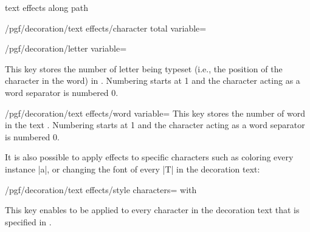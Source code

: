 \begin{decoration}{text effects along path}
\begin{key}{/pgf/decoration/text effects/character total variable=}
\end{key}

\begin{key}{/pgf/decoration/letter variable=}

  This key stores the number of letter being typeset (i.e., the position of the character
  in the word) in . Numbering starts at 1 and
  the character acting as a word separator is numbered 0.
  
\begin{codeexample}[]
\end{codeexample}

\end{key}

\begin{key}{/pgf/decoration/text effects/word variable=}
   This key stores the number of word in the text
 		. Numbering starts at 1 and
 		  the character acting as a word separator is numbered 0.

\begin{codeexample}[]
\end{codeexample}
\end{key}


  It is also possible to apply effects to specific
  characters such as coloring every instance |a|,
  or changing the font of every |T| in the decoration text:
  
\begin{key}{/pgf/decoration/text effects/style characters= with } 

  This key enables  to be applied to every character
  in the decoration text that is specified in .


\end{key}
\end{decoration}
